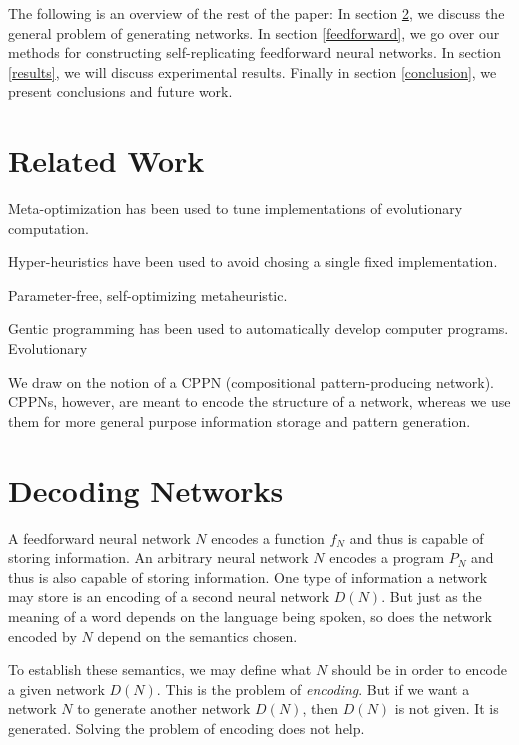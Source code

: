 \documentclass[12pt]{article}
\newcommand{\term}[1]{\emph{#1}}
\begin{document}
%
%


The following is an overview of the rest of the paper:
In section \ref{problemstatement}, we discuss the general problem of generating networks.
In section \ref{feedforward}, we go over our methods for constructing self-replicating feedforward neural networks.
In section \ref{results}, we will discuss experimental results. Finally in section \ref{conclusion}, we present conclusions and future work.

\section{Related Work}
\label{related}

Meta-optimization
has been used to tune implementations
of evolutionary computation.%
\cite{brest2006param}

Hyper-heuristics
have been used to avoid chosing a single fixed implementation.

Parameter-free, self-optimizing metaheuristic.

Gentic programming has been used
to automatically develop computer programs.
Evolutionary 

We draw on the notion of a CPPN (compositional
pattern-producing network).\cite{stanley2007cppn}
CPPNs, however, are meant to encode the structure
of a network, whereas we use them
for more general purpose information storage
and pattern generation.

\section{Decoding Networks}
\label{problemstatement}

A feedforward neural network $N$ encodes a function $f_N$
and thus is capable of storing information.
An arbitrary neural network $N$ encodes a program $P_N$
and thus is also capable of storing information.
One type of information a network may store
is an encoding of a second neural network $D(N)$.
But just as the meaning of a word
depends on the language being spoken,
so does the network encoded by $N$
depend on the semantics chosen.

To establish these semantics,
we may define what $N$ should be
in order to encode a given network $D(N)$.
This is the problem of \term{encoding}.
But if we want a network $N$
to generate another network $D(N)$,
then $D(N)$ is not given.
It is generated.
Solving the problem of encoding does not help.
\end{document}
